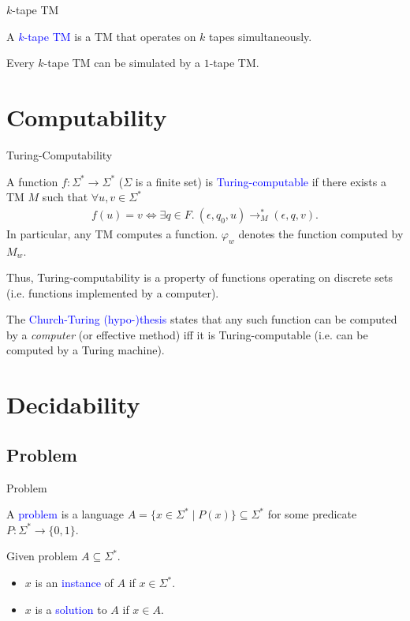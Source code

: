 \documentclass{beamer}
\theoremstyle{definition}
\def\spadding{\vspace{0.25cm}}
\def\b{\textcolor{blue}}
\begin{document}
\begin{frame}{$k$-tape TM}
    \begin{definition}
        A \b{$k$-tape TM} is a TM that operates on $k$ tapes simultaneously.
    \end{definition}\pause
    \begin{theorem}
        Every $k$-tape TM can be simulated by a $1$-tape TM.
    \end{theorem}
\end{frame}

\section{Computability}

\begin{frame}{Turing-Computability}
    \begin{definition}
        A function $f : \Sigma^* \to \Sigma^*$ ($\Sigma$ is a finite set) is \b{Turing-computable} if there exists a TM $M$ such that $\forall u,v \in \Sigma^*$ \begin{align*}
            f(u) = v \iff \exists q \in F.\ (\epsilon,q_0,u) \to_M^* (\epsilon,q,v).
        \end{align*}\pause
        In particular, any TM computes a function. $\varphi_w$ denotes the function computed by $M_w$.
    \end{definition}\pause\spadding
    Thus, Turing-computability is a property of functions operating on discrete sets (i.e. functions implemented by a computer).\pause\par\spadding
    The \b{Church-Turing (hypo-)thesis} states that any such function can be computed by a \textit{computer} (or effective method) iff it is Turing-computable (i.e. can be computed by a Turing machine).
\end{frame}

\section{Decidability}

\subsection{Problem}

\begin{frame}{Problem}
\begin{definition}
A \b{problem} is a language $A = \{x \in \Sigma^* \mid P(x)\} \subseteq \Sigma^*$ for some predicate $P : \Sigma^* \to \{0,1\}$.\pause\spadding

Given problem $A \subseteq \Sigma^*$.\pause
\begin{itemize}
    \item $x$ is an \b{instance} of $A$ if $x \in \Sigma^*$.\pause
    \item $x$ is a \b{solution} to $A$ if $x \in A$.
\end{itemize}
\end{definition}
\end{frame}
\end{document}

